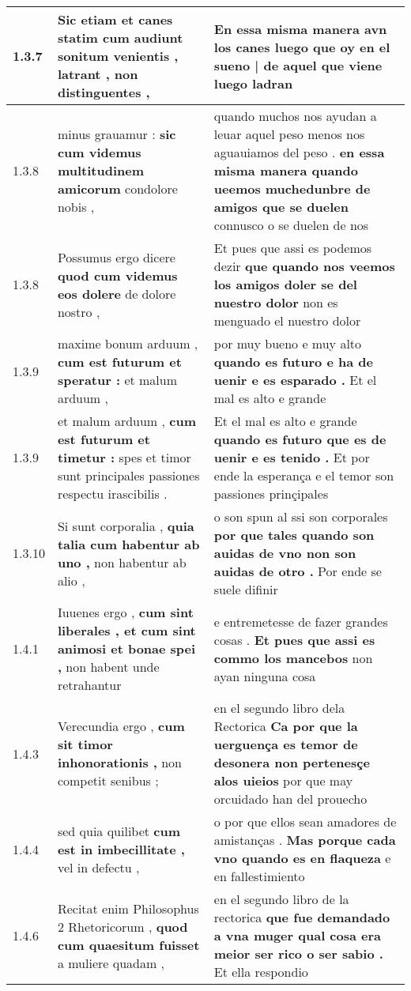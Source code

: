 \begin{tabular}{|p{1cm}|p{6.5cm}|p{6.5cm}|}
1.3.7 & Sic etiam et canes statim \textbf{ cum audiunt sonitum venientis , } latrant , non distinguentes , & En essa misma manera avn los canes \textbf{ luego que oy en el sueno | de aquel que viene } luego ladran \\\hline
1.3.8 & minus grauamur : \textbf{ sic cum videmus multitudinem amicorum } condolore nobis , & quando muchos nos ayudan a leuar aquel peso menos nos aguauiamos del peso . \textbf{ en essa misma manera quando ueemos muchedunbre de amigos que se duelen } connusco o se duelen de nos \\\hline
1.3.8 & Possumus ergo dicere \textbf{ quod cum videmus eos dolere } de dolore nostro , & Et pues que assi es podemos dezir \textbf{ que quando nos veemos los amigos doler se del nuestro dolor } non es menguado el nuestro dolor \\\hline
1.3.9 & maxime bonum arduum , \textbf{ cum est futurum et speratur : } et malum arduum , & por muy bueno e muy alto \textbf{ quando es futuro e ha de uenir e es esparado . } Et el mal es alto e grande \\\hline
1.3.9 & et malum arduum , \textbf{ cum est futurum et timetur : } spes et timor sunt principales passiones respectu irascibilis . & Et el mal es alto e grande \textbf{ quando es futuro que es de uenir e es tenido . } Et por ende la esperança e el temor son passiones prinçipales \\\hline
1.3.10 & Si sunt corporalia , \textbf{ quia talia cum habentur ab uno , } non habentur ab alio , & o son spun al ssi son corporales \textbf{ por que tales quando son auidas de vno non son auidas de otro . } Por ende se suele difinir \\\hline
1.4.1 & Iuuenes ergo , \textbf{ cum sint liberales , et cum sint animosi et bonae spei , } non habent unde retrahantur & e entremetesse de fazer grandes cosas . \textbf{ Et pues que assi es commo los mancebos } non ayan ninguna cosa \\\hline
1.4.3 & Verecundia ergo , \textbf{ cum sit timor inhonorationis , } non competit senibus ; & en el segundo libro dela Rectorica \textbf{ Ca por que la uerguença es temor de desonera non pertenesçe alos uieios } por que may orcuidado han del prouecho \\\hline
1.4.4 & sed quia quilibet \textbf{ cum est in imbecillitate , } vel in defectu , & o por que ellos sean amadores de amistanças . \textbf{ Mas porque cada vno quando es en flaqueza } e en fallestimiento \\\hline
1.4.6 & Recitat enim Philosophus 2 Rhetoricorum , \textbf{ quod cum quaesitum fuisset } a muliere quadam , & en el segundo libro de la rectorica \textbf{ que fue demandado a vna muger qual cosa era meior ser rico o ser sabio . } Et ella respondio \\\hline

\end{tabular}
